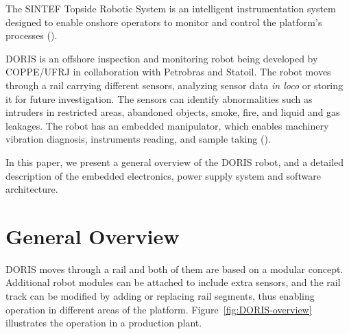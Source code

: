 \documentclass{ifacconf}
\begin{document}

The SINTEF Topside Robotic System is an intelligent instrumentation system
designed to enable onshore operators to monitor and control the platform’s
processes (\cite{kyrkjebo2009robotic}).

DORIS is an offshore inspection and monitoring robot being developed by
COPPE/UFRJ in collaboration with Petrobras and Statoil. The robot moves through
a rail carrying different sensors, analyzing sensor data \emph{in loco} or
storing it for future investigation. The sensors can identify abnormalities
such as intruders in restricted areas, abandoned objects, smoke, fire, and
liquid and gas leakages. The robot has an embedded manipulator, which enables
machinery vibration diagnosis, instruments reading, and sample taking
(\cite{cba}).

In this paper, we present a general overview of the DORIS robot, and a detailed
description of the embedded electronics, power supply system and software architecture.

\section{General Overview}\label{sec:general_overview}

DORIS moves through a rail and both of them are based on a modular concept.
Additional robot modules can be attached to include extra sensors, and the rail
track can be modified by adding or replacing rail segments, thus enabling
operation in different areas of the platform. Figure~\ref{fig:DORIS-overview}
illustrates the operation in a production plant.
\end{document}

